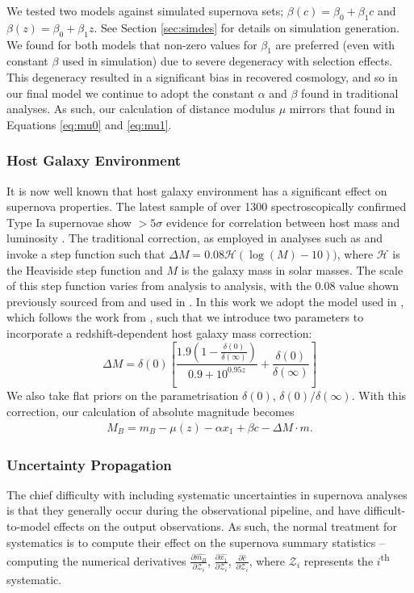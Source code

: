 \documentclass[a4paper,fleqn,usenatbib]{mnras}
\newcommand{\Z}{\mathcal{Z}}
\newcommand{\rubin}{\citetalias{Rubin2015}}
\begin{document}
We tested two models against simulated supernova sets; $\beta(c) = \beta_0 + \beta_1 c$ and $\beta(z) = \beta_0 + \beta_1 z$. See Section \ref{sec:simdes} for details on simulation generation. We found for both models that non-zero values for $\beta_1$ are preferred (even with constant $\beta$ used in simulation) due to severe degeneracy with selection effects. This degeneracy resulted in a significant bias in recovered cosmology, and so in our final model we continue to adopt the constant $\alpha$ and $\beta$ found in traditional analyses. As such, our calculation of distance modulus $\mu$ mirrors that found in Equations \eqref{eq:mu0} and \eqref{eq:mu1}.

\subsubsection{Host Galaxy Environment}

It is now well known that host galaxy environment has a significant effect on supernova properties. The latest sample of over 1300 spectroscopically confirmed Type Ia supernovae show $>5\sigma$ evidence for correlation between host mass and luminosity \citep{Uddin2017}. The traditional correction, as employed in analyses such as \citet{Suzuki2012} and \citet{Betoule2014} invoke a step function such that $\Delta M = 0.08 \mathcal{H}(\log(M) - 10))$, where $\mathcal{H}$ is the Heaviside step function and $M$ is the galaxy mass in solar masses. The scale of this step function varies from analysis to analysis, with the 0.08 value shown previously sourced from \cite{Sullivan2010} and used in \citet{Betoule2014}. In this work we adopt the model used in {\rubin}, which follows the work from \citet{Rigault2013}, such that we introduce two parameters to incorporate a redshift-dependent host galaxy mass correction:
\begin{equation}
\Delta M = \delta(0) \left[ \frac{1.9\left(1 - \frac{\delta(0)}{\delta(\infty)}\right)  }{0.9 + 10^{0.95z}} + \frac{\delta(0)}{\delta(\infty)}\right]
\end{equation}
We also take flat priors on the parametrisation $\delta(0)$, $\delta(0)/\delta(\infty)$. With this correction, our calculation of absolute magnitude becomes
\begin{align}
M_B = m_B - \mu(z) - \alpha x_1 + \beta c - \Delta M \cdot m. \label{eq:l2}
\end{align}



\subsubsection{Uncertainty Propagation}
\label{sec:systreat}
The chief difficulty with including systematic uncertainties in supernova analyses is that they generally occur during the observational pipeline, and have difficult-to-model effects on the output observations. As such, the normal treatment for systematics is to compute their effect on the supernova summary statistics -- computing the numerical derivatives $\frac{\partial \hat{m_B}}{\partial \Z_i}$, $\frac{\partial \hat{x_1}}{\partial \Z_i}$, $\frac{\partial \hat{c}}{\partial \Z_i}$, where $\Z_i$ represents the $i$\textsuperscript{th} systematic.
\end{document}
